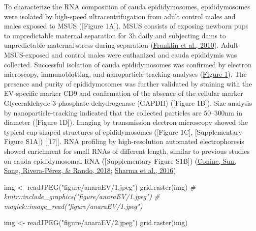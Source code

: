 \documentclass[12pt,twoside]{reedthesis}
\newenvironment{Shaded}{\begin{snugshade}}{\end{snugshade}}
\newcommand{\CommentTok}[1]{\textcolor[rgb]{0.56,0.35,0.01}{\textit{#1}}}
\newcommand{\FunctionTok}[1]{\textcolor[rgb]{0.00,0.00,0.00}{#1}}
\newcommand{\NormalTok}[1]{#1}
\newcommand{\OtherTok}[1]{\textcolor[rgb]{0.56,0.35,0.01}{#1}}
\newcommand{\StringTok}[1]{\textcolor[rgb]{0.31,0.60,0.02}{#1}}
\begin{document}
To characterize the RNA composition of cauda epididymosomes,
epididymosomes were isolated by high-speed ultracentrifugation from
adult control males and males exposed to MSUS ({[}Figure 1A{]}). MSUS
consists of exposing newborn pups to unpredictable maternal separation
for 3h daily and subjecting dams to unpredictable maternal stress during
separation (\protect\hyperlink{ref-franklin2010}{Franklin et al., 2010}). Adult MSUS-exposed and control males were
euthanized and cauda epididymis was collected. Successful isolation of
cauda epididymosomes was confirmed by electron microscopy,
immunoblotting, and nanoparticle-tracking analyses (\protect\hyperlink{figure-1}{Figure 1}). The
presence and purity of epididymosomes was further validated by staining
with the EV-specific marker CD9 and confirmation of the absence of the
cellular marker Glyceraldehyde 3-phosphate dehydrogenase (GAPDH)
({[}Figure 1B{]}). Size analysis by nanoparticle-tracking indicated that the
collected particles are 50--300nm in diameter ({[}Figure 1D{]}). Imaging by
transmission electron microscopy showed the typical cup-shaped
structures of epididymosomes ({[}Figure 1C{]}, {[}Supplementary Figure
S1A{]}) {[}{[}17{]}{]}. RNA profiling by high-resolution automated electrophoresis
showed enrichment for small RNAs of different length, similar to
previous studies on cauda epididymosomal RNA ({[}Supplementary Figure
S1B{]}) (\protect\hyperlink{ref-conine2018}{Conine, Sun, Song, Rivera-Pérez, \& Rando, 2018}; \protect\hyperlink{ref-sharma2016}{Sharma et al., 2016}).
\begin{Shaded}
\begin{Highlighting}[]
\NormalTok{img }\OtherTok{\textless{}{-}} \FunctionTok{readJPEG}\NormalTok{(}\StringTok{"figure/anaraEV/1.jpeg"}\NormalTok{)}
\FunctionTok{grid.raster}\NormalTok{(img)}
\CommentTok{\# knitr::include\_graphics("figure/anaraEV/1.jpeg")}
\CommentTok{\# magick::image\_read("figure/anaraEV/1.jpeg")}
\end{Highlighting}
\end{Shaded}
\begin{Shaded}
\begin{Highlighting}[]
\NormalTok{img }\OtherTok{\textless{}{-}} \FunctionTok{readJPEG}\NormalTok{(}\StringTok{"figure/anaraEV/2.jpeg"}\NormalTok{)}
\FunctionTok{grid.raster}\NormalTok{(img)}
\end{Highlighting}
\end{Shaded}
\end{document}
